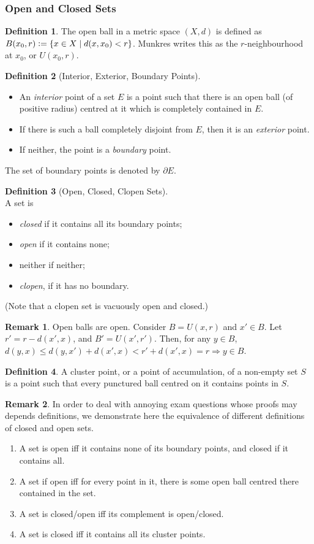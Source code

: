 \documentclass{article}
\theoremstyle{definition}
\newtheorem{defn}{Definition}[subsubsection]
\newtheorem{rmk}{Remark}[subsubsection]
\begin{document}
\subsubsection{Open and Closed Sets}
\begin{defn}
	The open ball in a metric space $(X,d)$ is defined as $B(x_0,r)\vcentcolon=\{x\in X\mid d(x,x_0)<r\}$. Munkres writes this as the $r$-neighbourhood at $x_0$, or $U(x_0,r)$.
\end{defn}
\begin{defn}[Interior, Exterior, Boundary Points]
	$ $\\
	\begin{itemize}
		\item An \emph{interior} point of a set $E$ is a point such that there is an open ball (of positive radius) centred at it which is completely contained in $E$.
		\item If there is such a ball completely disjoint from $E$, then it is an \emph{exterior} point.
		\item If neither, the point is a \emph{boundary} point.
	\end{itemize}
	The set of boundary points is denoted by $\partial E$.
\end{defn}
\begin{defn}[Open, Closed, Clopen Sets]
	$ $\\A set is
	\begin{itemize}
		\item \emph{closed} if it contains all its boundary points;
		\item \emph{open} if it contains none;
		\item neither if neither;
		\item \emph{clopen}, if it has no boundary.
	\end{itemize}
	(Note that a clopen set is vacuously open and closed.)
\end{defn}
\begin{rmk}
	Open balls are open. Consider $B=U(x,r)$ and $x'\in B$. Let $r'=r-d(x',x)$, and $B'=U(x',r')$. Then, for any $y\in B$, $d(y,x)\leq d(y,x')+d(x',x)<r'+d(x',x)=r\Rightarrow y\in B$.
\end{rmk}
\begin{defn}
	A cluster point, or a point of accumulation, of a non-empty set $S$ is a point such that every punctured ball centred on it contains points in $S$.
\end{defn}
\begin{rmk}
	In order to deal with annoying exam questions whose proofs may depends definitions, we demonstrate here the equivalence of different definitions of closed and open sets.
	\begin{enumerate}
		\item A set is open iff it contains none of its boundary points, and closed if it contains all.
		\item A set if open iff for every point in it, there is some open ball centred there contained in the set.
		\item A set is closed/open iff its complement is open/closed.
		\item A set is closed iff it contains all its cluster points.
	\end{enumerate}
\end{rmk}
\end{document}
